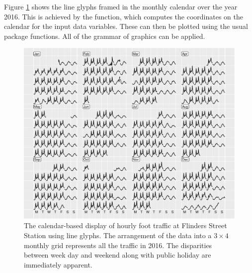 \documentclass[article]{jss}
\theoremstyle{definition}
\theoremstyle{definition}
\theoremstyle{definition}
\theoremstyle{remark}
\begin{document}
\label{sec:algorithm}

Figure \ref{fig:flinders-2016} shows the line glyphs framed in the
monthly calendar over the year 2016. This is achieved by the
 function, which computes the coordinates on the
calendar for the input data variables. These can then be plotted using
the usual  package \citep{R-ggplot2} functions. All of the
grammar of graphics \citep{wilkinson2006grammar, wickham2009ggplot2} can
be applied.

\begin{CodeChunk}
\begin{figure}

{\centering \includegraphics[width=\textwidth]{figure/flinders-2016-1} 

}

\caption[The calendar-based display of hourly foot
traffic at Flinders Street Station using line glyphs. The arrangement of
the data into a \(3 \times 4\) monthly grid represents all the traffic
in 2016. The disparities between week day and weekend along with public
holiday are immediately apparent.]{The calendar-based display of hourly foot
traffic at Flinders Street Station using line glyphs. The arrangement of
the data into a \(3 \times 4\) monthly grid represents all the traffic
in 2016. The disparities between week day and weekend along with public
holiday are immediately apparent.}\label{fig:flinders-2016}
\end{figure}
\end{CodeChunk}
\end{document}
